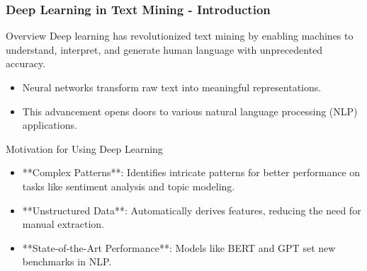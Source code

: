 \documentclass[aspectratio=169]{beamer}
\begin{document}
\begin{frame}[fragile]
    \frametitle{Deep Learning in Text Mining - Introduction}
    \begin{block}{Overview}
        Deep learning has revolutionized text mining by enabling machines to understand, interpret, and generate human language with unprecedented accuracy.
    \end{block}
    \begin{itemize}
        \item Neural networks transform raw text into meaningful representations.
        \item This advancement opens doors to various natural language processing (NLP) applications.
    \end{itemize}
    \begin{block}{Motivation for Using Deep Learning}
        \begin{itemize}
            \item **Complex Patterns**: Identifies intricate patterns for better performance on tasks like sentiment analysis and topic modeling.
            \item **Unstructured Data**: Automatically derives features, reducing the need for manual extraction.
            \item **State-of-the-Art Performance**: Models like BERT and GPT set new benchmarks in NLP.
        \end{itemize}
    \end{block}
\end{frame}
\end{document}
